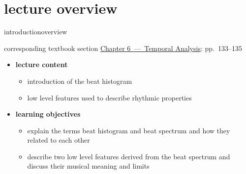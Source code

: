 




\subtitle{Module 6.4: Rhythm Descriptors}


	

    \section[overview]{lecture overview}
        \begin{frame}{introduction}{overview}
            \begin{block}{corresponding textbook section}
                    \href{http://ieeexplore.ieee.org/xpl/articleDetails.jsp?arnumber=6331122}{Chapter 6~---~Temporal Analysis}: pp.~133--135
            \end{block}

            \begin{itemize}
                \item   \textbf{lecture content}
                    \begin{itemize}
                        \item   introduction of the beat histogram
                        \item   low level features used to describe rhythmic properties
                    \end{itemize}
                \bigskip
                \item<2->   \textbf{learning objectives}
                    \begin{itemize}
                        \item   explain the terms beat histogram and beat spectrum and how they related to each other
                        \item   describe two low level features derived from the beat spectrum and discuss their musical meaning and limits
                    \end{itemize}
            \end{itemize}
        \end{frame}

